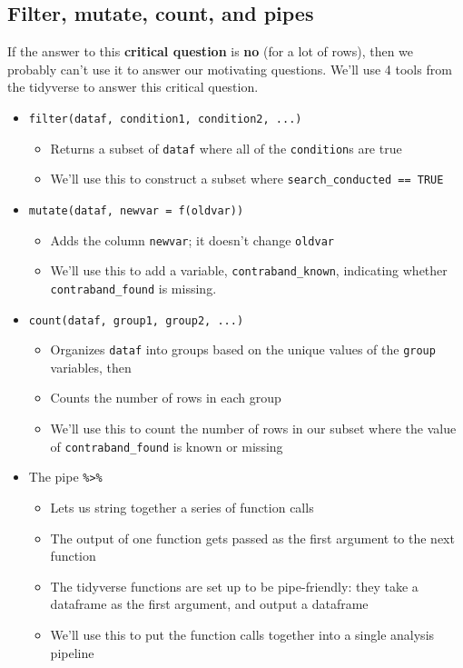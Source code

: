 \documentclass[
]{article}
\providecommand{\tightlist}{%
  \setlength{\itemsep}{0pt}\setlength{\parskip}{0pt}}
\begin{document}
\hypertarget{filter-mutate-count-and-pipes}{%
\subsection{Filter, mutate, count, and pipes}\label{filter-mutate-count-and-pipes}}

If the answer to this \textbf{critical question} is \textbf{no} (for a lot of rows), then we probably can't use it to answer our motivating questions. We'll use 4 tools from the tidyverse to answer this critical question.

\begin{itemize}
\tightlist
\item
  \texttt{filter(dataf,\ condition1,\ condition2,\ ...)}

  \begin{itemize}
  \tightlist
  \item
    Returns a subset of \texttt{dataf} where all of the \texttt{condition}s are true
  \item
    We'll use this to construct a subset where \texttt{search\_conducted\ ==\ TRUE}
  \end{itemize}
\item
  \texttt{mutate(dataf,\ newvar\ =\ f(oldvar))}

  \begin{itemize}
  \tightlist
  \item
    Adds the column \texttt{newvar}; it doesn't change \texttt{oldvar}
  \item
    We'll use this to add a variable, \texttt{contraband\_known}, indicating whether \texttt{contraband\_found} is missing.
  \end{itemize}
\item
  \texttt{count(dataf,\ group1,\ group2,\ ...)}

  \begin{itemize}
  \tightlist
  \item
    Organizes \texttt{dataf} into groups based on the unique values of the \texttt{group} variables, then
  \item
    Counts the number of rows in each group
  \item
    We'll use this to count the number of rows in our subset where the value of \texttt{contraband\_found} is known or missing
  \end{itemize}
\item
  The pipe \texttt{\%\textgreater{}\%}

  \begin{itemize}
  \tightlist
  \item
    Lets us string together a series of function calls
  \item
    The output of one function gets passed as the first argument to the next function
  \item
    The tidyverse functions are set up to be pipe-friendly: they take a dataframe as the first argument, and output a dataframe
  \item
    We'll use this to put the function calls together into a single analysis pipeline


\end{itemize}
\end{itemize}
\end{document}
